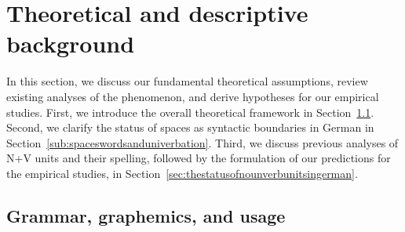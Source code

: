 \documentclass[biblatex, charis, linguex]{glossa}\usepackage{knitr}
\begin{document}
\section{Theoretical and descriptive background}
\label{sec:theoreticalbackground}

In this section, we discuss our fundamental theoretical assumptions, review existing analyses of the phenomenon, and derive hypotheses for our empirical studies.
First, we introduce the overall theoretical framework in Section~\ref{sub:grammargraphemicsandusage}.
Second, we clarify the status of spaces as syntactic boundaries in German in Section~\ref{sub:spaceswordsanduniverbation}.
Third, we discuss previous analyses of N+V units and their spelling, followed by the formulation of our predictions for the empirical studies, in Section~\ref{sec:thestatusofnounverbunitsingerman}.

\subsection{Grammar, graphemics, and usage}
\label{sub:grammargraphemicsandusage}
\end{document}
